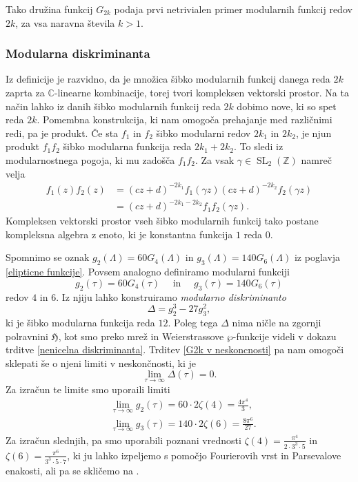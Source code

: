 \documentclass[mat1]{fmfdelo}
\numberwithin{equation}{section}
\newcommand{\Z}{\mathbb Z}
\newcommand{\C}{\mathbb C}
\newcommand{\HH}{\mathfrak{H}}
\theoremstyle{definition}
\begin{document}
Tako družina funkcij $G_{2k}$ podaja prvi netrivialen primer modularnih funkcij redov $2k$, za vsa naravna števila $k > 1$.


\subsubsection*{Modularna diskriminanta}
Iz definicije je razvidno, da je množica šibko modularnih funkcij danega reda $2k$ zaprta za $\C$-linearne kombinacije, torej tvori kompleksen vektorski prostor. Na ta način lahko iz danih šibko modularnih funkcij reda $2k$ dobimo nove, ki so spet reda $2k$. Pomembna konstrukcija, ki nam omogoča prehajanje med različnimi redi, pa je produkt. Če sta $f_1$ in $f_2$ šibko modularni redov $2k_1$ in $2k_2$, je njun produkt $f_1f_2$ šibko modularna funkcija reda $2k_1 + 2k_2$. To sledi iz modularnostnega pogoja, ki mu zadošča $f_1f_2$. Za vsak $\gamma \in \operatorname{SL}_2(\Z)$ namreč velja
\begin{align*}
    f_1(z)f_2(z) &= 
    (cz + d)^{-2k_1} f_1\left(\gamma z\right)(cz + d)^{-2k_2} f_2\left(\gamma z\right) \\
    &= (cz + d)^{-2k_1 - 2k_2} f_1f_2\left(\gamma z\right).
\end{align*}
Kompleksen vektorski prostor vseh šibko modularnih funkcij tako postane kompleksna algebra z enoto, ki je konstantna funkcija $1$ reda $0$.
\newline

Spomnimo se oznak $g_2(\Lambda) = 60G_4(\Lambda)$ in $g_3(\Lambda) = 140G_6(\Lambda)$ iz poglavja \ref{elipticne funkcije}. Povsem analogno definiramo modularni funkciji
\[
    g_2(\tau) = 60G_4(\tau) \quad \text{ in } \quad g_3(\tau) = 140G_6(\tau)
\]
redov $4$ in $6$. Iz njiju lahko konstruiramo \emph{modularno diskriminanto}
\[
    \Delta = g_2^3 - 27g_3^2,
\]
ki je šibko modularna funkcija reda $12$. Poleg tega $\Delta$ nima ničle na zgornji polravnini $\HH$, kot smo preko mrež in Weierstrassove $\wp$-funkcije videli v dokazu trditve \ref{nenicelna diskriminanta}. Trditev \ref{G2k v neskoncnosti} pa nam omogoči sklepati še o njeni limiti v neskončnosti, ki je 
\[
    \lim_{\tau \to \infty} \Delta(\tau) = 0.
\]
Za izračun te limite smo uporaili limiti 
\begin{align*}
    &\lim_{\tau \to \infty} g_2(\tau) = 60\cdot2 \zeta(4) = \frac{4\pi^4}{3},\\
    &\lim_{\tau \to \infty} g_3(\tau) = 140\cdot2 \zeta(6) = \frac{8\pi^6}{27}.
\end{align*}
Za izračun slednjih, pa smo uporabili poznani vrednosti $\zeta(4) = \frac{\pi^4}{2\cdot3^3\cdot5}$ in $\zeta(6) = \frac{\pi^6}{3^3\cdot5\cdot7}$, ki ju lahko izpeljemo s pomočjo Fourierovih vrst in Parsevalove enakosti, ali pa se skličemo na \cite[VII, \S4.1]{Serre}.
\end{document}
